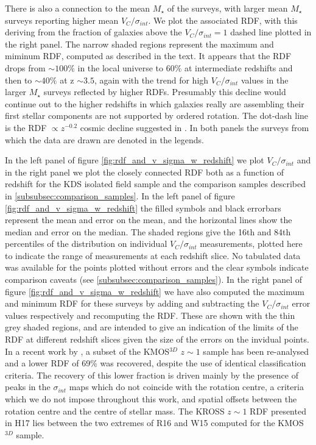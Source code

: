 \documentclass[fleqn,usenatbib]{mn2e}
\begin{document}
\begin{figure*}
{    There is also a connection to the mean $M_{\star}$ of the surveys, with larger mean $M_{\star}$ surveys reporting higher mean $V_{C}/\sigma_{int}$.
    We plot the associated RDF, with this deriving from the fraction of galaxies above the $V_{C}/\sigma_{int} = 1$ dashed line plotted in the right panel.
    The narrow shaded regions represent the maximum and miminum RDF, computed as described in the text.
    It appears that the RDF drops from $\sim 100\%$ in the local universe to $60\%$ at intermediate redshifts and then to $\sim 40\%$ at z $\sim 3.5$, again with the trend for high $V_{C}/\sigma_{int}$ values in the larger $M_{\star}$ surveys reflected by higher RDFs.
    Presumably this decline would continue out to the higher redshifts in which galaxies really are assembling their first stellar components are not supported by ordered rotation.
    The dot-dash line is the RDF $\propto z^{-0.2}$ cosmic decline suggested in \protect\cite{Stott2016}.
    In both panels the surveys from which the data are drawn are denoted in the legends.
}
    \label{fig:rdf_and_v_sigma_w_redshift}
\end{figure*}

In the left panel of figure \ref{fig:rdf_and_v_sigma_w_redshift} we plot $V_{C}/\sigma_{int}$ and in the right panel we plot the closely connected RDF both as a function of redshift for the KDS isolated field sample and the comparison samples described in \cref{subsubsec:comparison_samples}.
In the left panel of figure \ref{fig:rdf_and_v_sigma_w_redshift} the filled symbols and black errorbars represent the mean and error on the mean, and the horizontal lines show the median and error on the median.   
The shaded regions give the 16th and 84th percentiles of the distribution on individual $V_{C}/\sigma_{int}$ measurements, plotted here to indicate the range of measurements at each redshift slice.
No tabulated data was available for the points plotted without errors and the clear symbols indicate comparison caveats (see \cref{subsubsec:comparison_samples}).
In the right panel of figure \ref{fig:rdf_and_v_sigma_w_redshift} we have also computed the maximum and minimum RDF for these surveys by adding and subtracting the $V_{C}/\sigma_{int}$ error values respectively and recomputing the RDF.
These are shown with the thin grey shaded regions, and are intended to give an indication of the limits of the RDF at different redshift slices given the size of the errors on the invidual points.
In a recent work by \cite[R16]{Rodrigues2016}, a subset of the KMOS$^{3D}$ $z \sim 1$ sample has been re-analysed and a lower RDF of 69\% was recovered, despite the use of identical classification criteria.
The recovery of this lower fraction is driven mainly by the presence of peaks in the $\sigma_{int}$ maps which do not coincide with the rotation centre, a criteria which we do not impose throughout this work, and spatial offsets between the rotation centre and the centre of stellar mass.
The KROSS $z\sim1$ RDF presented in H17 lies between the two extremes of R16 and W15 computed for the KMOS$^{3D}$ sample. \\
\end{document}
